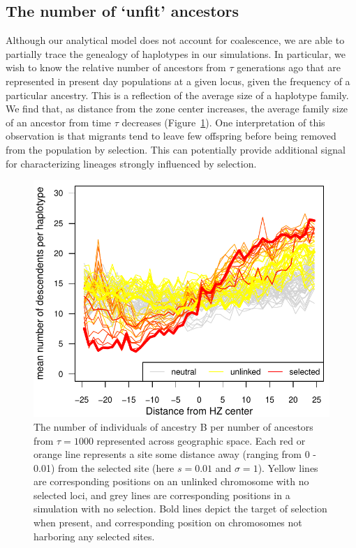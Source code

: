 \documentclass[11pt,letterpaper]{article}
\begin{document}
\subsection*{The number of `unfit' ancestors}
Although our analytical model does not account for coalescence, we are able to partially trace the genealogy of haplotypes in our simulations. In particular, we wish to know the relative number of ancestors from $\tau$ generations ago that are represented in present day populations at a given locus, given the frequency of a particular ancestry. This is a reflection of the average size of a haplotype family. We find that, as distance from the zone center increases, the average family size of an ancestor from time $\tau$ decreases (Figure~\ref{Fig:family_size}). One interpretation of this observation is that migrants tend to leave few offspring before being removed from the population by selection. This can potentially provide additional signal for characterizing lineages strongly influenced by selection.

\begin{figure}
\includegraphics{figs/number_of_ancestors_tau1000}
\caption{The number of individuals of ancestry B per number of ancestors from $\tau=1000$ represented across geographic space. Each red or orange line represents a site some distance away (ranging from 0 - 0.01) from the selected site (here $s=0.01$ and $\sigma=1$). Yellow lines are corresponding positions on an unlinked chromosome with no selected loci, and grey lines are corresponding positions in a simulation with no selection.  Bold lines depict the target of selection when present, and corresponding position on chromosomes not harboring any selected sites.}\label{Fig:family_size}
\end{figure}
\end{document}
